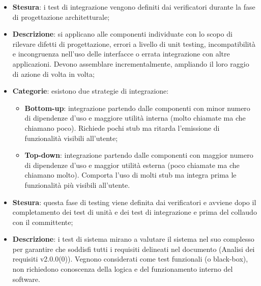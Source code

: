 \documentclass[10pt, a4paper]{article}
\begin{document}

\begin{itemize}
    \item \textbf{Stesura}: i test di integrazione vengono definiti dai verificatori durante la fase di progettazione architetturale;
    \item \textbf{Descrizione}: si applicano alle componenti individuate con lo scopo di rilevare difetti di progettazione, errori a livello di unit testing, incompatibilità e incongruenza nell'uso delle interfacce o errata integrazione con altre applicazioni. Devono assemblare incrementalmente, ampliando il loro raggio di azione di volta in volta;
    \item \textbf{Categorie}: esistono due strategie di integrazione:
    \begin{itemize}
        \item \textbf{Bottom-up}: integrazione partendo dalle componenti con minor numero di dipendenze d'uso e maggiore utilità interna (molto chiamate ma che chiamano poco). Richiede pochi stub ma ritarda l'emissione di funzionalità visibili all'utente;
        \item \textbf{Top-down}: integrazione partendo dalle componenti con maggior numero di dipendenze d'uso e maggior utilità esterna (poco chiamate ma che chiamano molto). Comporta l'uso di molti stub ma integra prima le funzionalità più visibili all'utente.
    \end{itemize}
\end{itemize}


\begin{itemize}
    \item \textbf{Stesura}: questa fase di testing viene definita dai verificatori e avviene dopo il completamento dei test di unità e dei test di integrazione e prima del collaudo con il committente;
    \item \textbf{Descrizione}: i test di sistema mirano a valutare il sistema nel suo complesso per garantire che soddisfi tutti i requisiti delineati nel documento (Analisi dei requisiti v2.0.0(0)). Vegnono considerati come test funzionali (o black-box), non richiedono conoscenza della logica e del funzionamento interno del software.
\end{itemize}
\end{document}
